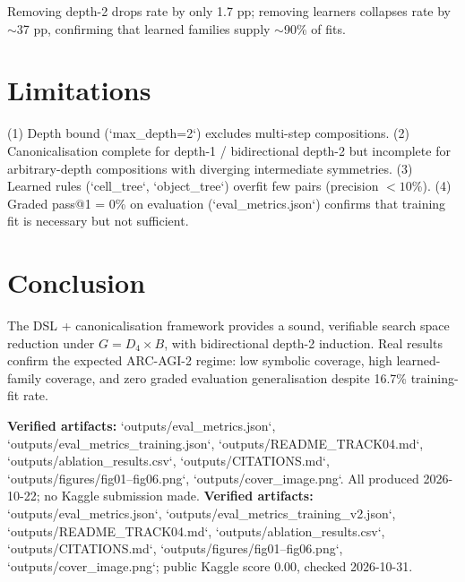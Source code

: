 \documentclass[11pt,a4paper]{article}
\begin{document}
Removing depth-2 drops rate by only 1.7 pp; removing learners collapses rate by $\sim$37 pp, confirming that learned families supply $\sim$90\% of fits.

\section{Limitations}

(1) Depth bound (`max_depth=2`) excludes multi-step compositions. (2) Canonicalisation complete for depth-1 / bidirectional depth-2 but incomplete for arbitrary-depth compositions with diverging intermediate symmetries. (3) Learned rules (`cell_tree`, `object_tree`) overfit few pairs (precision $<10$\%). (4) Graded pass@1 = 0\% on evaluation (`eval_metrics.json`) confirms that training fit is necessary but not sufficient.

\section{Conclusion}

The DSL + canonicalisation framework provides a sound, verifiable search space reduction under $G = D_4 \times B$, with bidirectional depth-2 induction. Real results confirm the expected ARC-AGI-2 regime: low symbolic coverage, high learned-family coverage, and zero graded evaluation generalisation despite 16.7\% training-fit rate.

\vspace{1cm}
\noindent\textbf{Verified artifacts:} `outputs/eval_metrics.json`, `outputs/eval_metrics_training.json`, `outputs/README_TRACK04.md`, `outputs/ablation_results.csv`, `outputs/CITATIONS.md`, `outputs/figures/fig01--fig06.png`, `outputs/cover_image.png`. All produced 2026-10-22; no Kaggle submission made.
\noindent\textbf{Verified artifacts:} `outputs/eval_metrics.json`, `outputs/eval_metrics_training_v2.json`, `outputs/README_TRACK04.md`, `outputs/ablation_results.csv`, `outputs/CITATIONS.md`, `outputs/figures/fig01--fig06.png`, `outputs/cover_image.png`; public Kaggle score 0.00, checked 2026-10-31.
\end{document}
